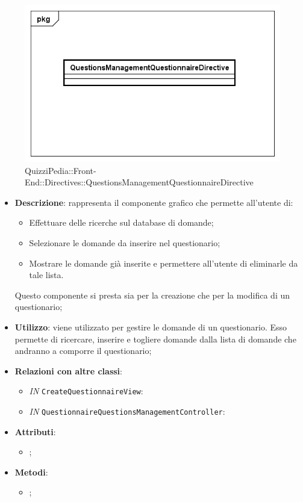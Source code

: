 \begin{figure}[h]
	\centering
	\includegraphics[scale=0.5,keepaspectratio]{UML/Classi/Front-End/QuizziPedia_Front-end_Directives_QuestionsManagementQuestionnaireDirective.png}
	\caption{QuizziPedia::Front-End::Directives::QuestionsManagementQuestionnaireDirective}
\end{figure}

\begin{itemize}
	\item \textbf{Descrizione}: rappresenta il componente grafico che permette all'utente di:
		\begin{itemize}
			\item Effettuare delle ricerche sul database di domande;
			\item Selezionare le domande da inserire nel questionario;
			\item Mostrare le domande già inserite e permettere all'utente di eliminarle da tale lista.
		\end{itemize}
		Questo componente si presta sia per la creazione che per la modifica di un questionario;
	\item \textbf{Utilizzo}: viene utilizzato per gestire le domande di un questionario. Esso permette di ricercare, inserire e togliere domande dalla lista di domande che andranno a comporre il questionario;
	\item \textbf{Relazioni con altre classi}: 
	\begin{itemize}
		\item \textit{IN} \texttt{CreateQuestionnaireView}: 
		\item \textit{IN} \texttt{QuestionnaireQuestionsManagementController}: 
	\end{itemize}
	\item \textbf{Attributi}: 
	\begin{itemize}
		\item ;
	\end{itemize}
	\item \textbf{Metodi}: 
	\begin{itemize}
		\item ;
	\end{itemize}
\end{itemize}